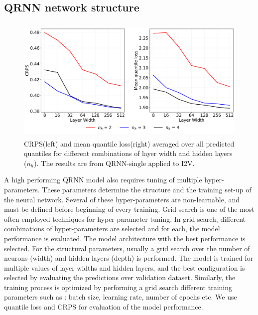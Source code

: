 \documentclass[amt]{copernicus}
\begin{document}
\subsection{QRNN network structure}
\label{appendix:hyperparamter}
%
\begin{figure}[t]
	\centering
	\includegraphics[height=60mm]{Figures/CRPS.pdf} 
	\caption{CRPS(left) and mean quantile loss(right) averaged over all predicted quantiles for different combinations of layer width and hidden layers ($n_h$). The results are from QRNN-single applied to I2V.}
	\label{fig:grid_search}	
\end{figure}
A high performing QRNN model also requires tuning of multiple hyper-parameters. These parameters determine the structure and the training set-up of the neural network. Several of these hyper-parameters are non-learnable, and must be defined before beginning of every training. Grid search is one of the most often employed techniques for hyper-parameter tuning. In grid search, different combinations of hyper-parameters are selected and for each, the model performance is evaluated. The model architecture with the best performance is selected. For the structural parameters, usually a grid search over the number of neurons (width) and hidden layers (depth) is performed. The model is trained for multiple values of layer widths and hidden layers, and the best configuration is selected by evaluating the predictions over validation dataset. Similarly, the training process is optimized by performing a grid search different training parameters such as : batch size, learning rate, number of epochs etc. We use quantile loss and CRPS for evaluation of the model performance.
\end{document}
